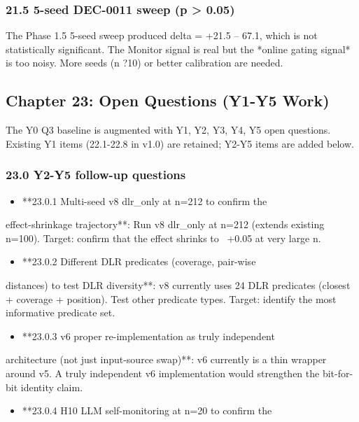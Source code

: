 \documentclass[11pt]{article}
\begin{document}
\subsubsection{21.5 5-seed DEC-0011 sweep (p > 0.05)}

The Phase 1.5 5-seed sweep produced delta = +21.5 -- 67.1, which is not
statistically significant. The Monitor signal is real but the *online gating
signal* is too noisy. More seeds (n ?10) or better calibration are needed.

\hrulefill

\subsection{Chapter 23: Open Questions (Y1-Y5 Work)}

The Y0 Q3 baseline is augmented with Y1, Y2, Y3, Y4, Y5 open
questions. Existing Y1 items (22.1-22.8 in v1.0) are retained;
Y2-Y5 items are added below.

\subsubsection{23.0 Y2-Y5 follow-up questions}

\begin{itemize}
  \item **23.0.1 Multi-seed v8 dlr\_only at n=212 to confirm the
\end{itemize}

  effect-shrinkage trajectory**: Run v8 dlr\_only at n=212
  (extends existing n=100). Target: confirm that the effect
  shrinks to ~+0.05 at very large n.
\begin{itemize}
  \item **23.0.2 Different DLR predicates (coverage, pair-wise
\end{itemize}

  distances) to test DLR diversity**: v8 currently uses
  24 DLR predicates (closest + coverage + position). Test
  other predicate types. Target: identify the most informative
  predicate set.
\begin{itemize}
  \item **23.0.3 v6 proper re-implementation as truly independent
\end{itemize}

  architecture (not just input-source swap)**: v6 currently is
  a thin wrapper around v5. A truly independent v6
  implementation would strengthen the bit-for-bit identity
  claim.
\begin{itemize}
  \item **23.0.4 H10 LLM self-monitoring at n=20 to confirm the
\end{itemize}
\end{document}
